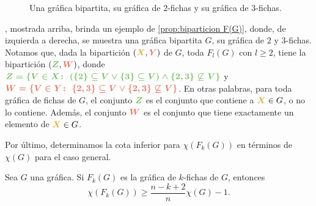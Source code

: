 \begin{figure}[ht!]
\caption{Una gr\'afica bipartita, su gr\'afica de $2$-fichas y su gr\'afica de
 $3$-fichas.}
\label{fig:ex-bip}
\end{figure}


, mostrada arriba, brinda un ejemplo de \cref{prop:biparticion
F(G)}, donde, de izquierda a derecha, se muestra una gr\'afica bipartita $G$, su
gr\'afica de $2$ y $3$-fichas. Notamos que, dada la bipartici\'on
$({\color{oro}\boldsymbol {X}},{\color{salmon}\boldsymbol {Y}})$ de $G$, toda
$F_l(G)$ con $l\geq 2$, tiene la bipartici\'on $({\color{verde} \boldsymbol
{Z}},{\color{salmon}\boldsymbol {W}})$, donde ${\color{verde}\boldsymbol
{Z=\{V\in X\colon\ (\{2\}\subseteq V  \lor \{3\} \subseteq V) \land
\{2,3\}\not\subseteq V\}}}$ y ${\color{salmon}\boldsymbol {W=\{V \in Y\colon\
\{2,3\}\subseteq V \lor \{2,3\}\not\subseteq V\}}}$. En otras palabras, para
toda gr\'afica de fichas de $G$, el conjunto ${\color{verde}\boldsymbol {Z}}$ es
el conjunto que contiene a ${\color{oro}\boldsymbol {X}}\in G$, o no lo
contiene. Adem\'as, el conjunto ${\color{salmon}\boldsymbol {W}}$ es el conjunto
que tiene exactamente un elemento de ${\color{oro}\boldsymbol {X}}\in G$.

Por \'ultimo, determinamos la cota inferior para $\chi (F_k(G))$ en t\'erminos
de $\chi (G)$ para el caso general.

\begin{teorema}
\label{teo:numCrom-k}
    Sea $G$ una gr\'afica. Si $F_k(G)$ es la gr\'afica de $k$-fichas de $G$,
    entonces
    \[
        \chi(F_k(G)) \geq \frac{n-k+2}{n} \chi(G) -1.
    \]
\end{teorema}

